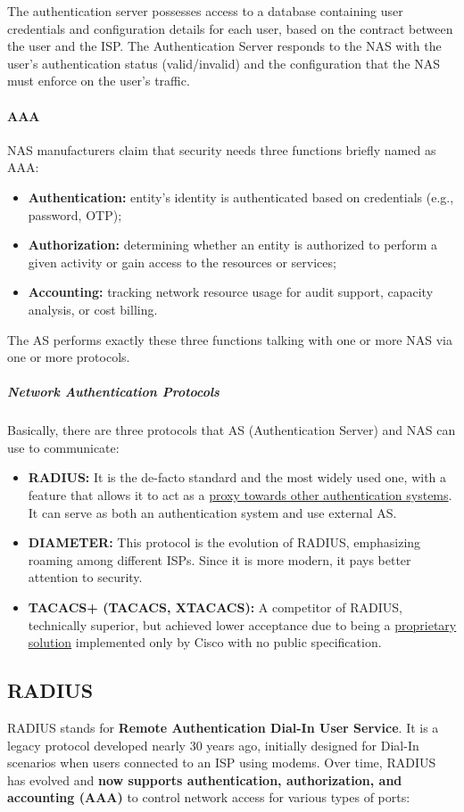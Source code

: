 The authentication server possesses access to a database containing user credentials and configuration details for each user, based on the contract between the user and the ISP. The Authentication Server responds to the NAS with the user's authentication status (valid/invalid) and the configuration that the NAS must enforce on the user's traffic.

\paragraph{AAA}
NAS manufacturers claim that security needs three functions briefly named as AAA:
\begin{itemize}
    \item \textbf{Authentication:} entity's identity is authenticated based on credentials (e.g., password, OTP);
    \item \textbf{Authorization:} determining whether an entity is authorized to perform a given activity or gain access to the resources or services;
    \item \textbf{Accounting:} tracking network resource usage for audit support, capacity analysis, or cost billing.
\end{itemize}

The AS performs exactly these three functions talking with one or more NAS via one or more protocols.

\subparagraph{Network Authentication Protocols}
Basically, there are three protocols that AS (Authentication Server) and NAS can use to communicate:
\begin{itemize}
    \item \textbf{RADIUS:} It is the de-facto standard and the most widely used one, with a feature that allows it to act as a \underline{proxy towards other authentication systems}. It can serve as both an authentication system and use external AS.
    \item \textbf{DIAMETER:} This protocol is the evolution of RADIUS, emphasizing roaming among different ISPs. Since it is more modern, it pays better attention to security.
    \item \textbf{TACACS+ (TACACS, XTACACS):} A competitor of RADIUS, technically superior, but achieved lower acceptance due to being a \underline{proprietary solution} implemented only by Cisco with no public specification.
\end{itemize}


\subsection{RADIUS}\label{chap:radius}
RADIUS stands for \textbf{Remote Authentication Dial-In User Service}. It is a legacy protocol developed nearly 30 years ago, initially designed for Dial-In scenarios when users connected to an ISP using modems. Over time, RADIUS has evolved and \textbf{now supports authentication, authorization, and accounting (AAA)} to control network access for various types of ports:

